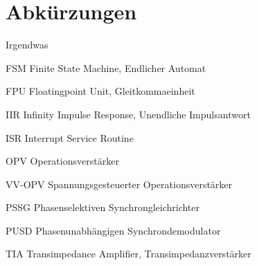 
\renewcommand{\contentsname}{Inhaltsverzeichnis}
\tableofcontents


\chapter*{Abkürzungen}
\begin{bfscript}{Irgendwas}
\item[FSM] Finite State Machine, Endlicher Automat
\item[FPU] Floatingpoint Unit, Gleitkommaeinheit
\item[IIR] Infinity Impulse Response, Unendliche Impulsantwort
\item[ISR] Interrupt Service Routine
\item[OPV] Operationsverstärker
\item[VV-OPV] Spannungsgesteuerter Operationsverstärker
\item[PSSG] Phasenselektiven Synchrongleichrichter
\item[PUSD] Phasenunabhängigen Synchrondemodulator
\item[TIA] Transimpedance Amplifier, Transimpedanzverstärker
\end{bfscript}



\newpage
{}
